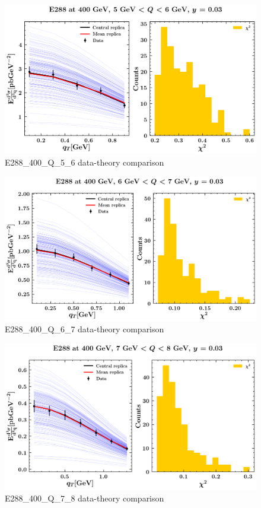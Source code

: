 \documentclass[
]{article}
\begin{document}
\begin{figure}
\centering
\includegraphics{pngplots/E288_400_Q_5_6.png}
\caption{E288\_400\_Q\_5\_6 data-theory comparison}
\end{figure}

\begin{figure}
\centering
\includegraphics{pngplots/E288_400_Q_6_7.png}
\caption{E288\_400\_Q\_6\_7 data-theory comparison}
\end{figure}

\begin{figure}
\centering
\includegraphics{pngplots/E288_400_Q_7_8.png}
\caption{E288\_400\_Q\_7\_8 data-theory comparison}
\end{figure}
\end{document}
